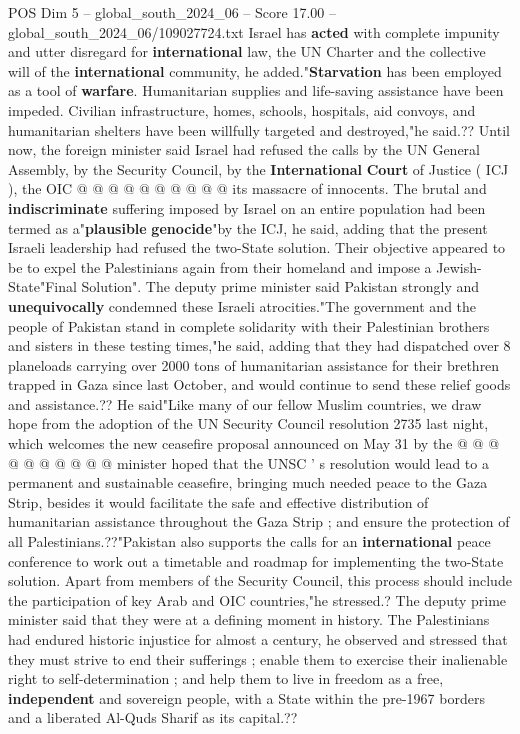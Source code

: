 \begin{textsample}{POS Dim 5 – global\_south\_2024\_06 – Score 17.00 – global\_south\_2024\_06/109027724.txt}
Israel has \textbf{acted} with complete impunity and utter disregard for \textbf{international} law, the UN Charter and the collective will of the \textbf{international} community, he added."\textbf{Starvation} has been employed as a tool of \textbf{warfare}.
Humanitarian supplies and life-saving assistance have been impeded.
Civilian infrastructure, homes, schools, hospitals, aid convoys, and humanitarian shelters have been willfully targeted and destroyed,"he said.??
Until now, the foreign minister said Israel had refused the calls by the UN General Assembly, by the Security Council, by the \textbf{International} \textbf{Court} of Justice ( ICJ ), the OIC @ @ @ @ @ @ @ @ @ @ its massacre of innocents.
The brutal and \textbf{indiscriminate} suffering imposed by Israel on an entire population had been termed as a"\textbf{plausible} \textbf{genocide}"by the ICJ, he said, adding that the present Israeli leadership had refused the two-State solution.
Their objective appeared to be to expel the Palestinians again from their homeland and impose a Jewish-State"Final Solution".
The deputy prime minister said Pakistan strongly and \textbf{unequivocally} condemned these Israeli atrocities."The government and the people of Pakistan stand in complete solidarity with their Palestinian brothers and sisters in these testing times,"he said, adding that they had dispatched over 8 planeloads carrying over 2000 tons of humanitarian assistance for their brethren trapped in Gaza since last October, and would continue to send these relief goods and assistance.??
He said"Like many of our fellow Muslim countries, we draw hope from the adoption of the UN Security Council resolution 2735 last night, which welcomes the new ceasefire proposal announced on May 31 by the @ @ @ @ @ @ @ @ @ @ minister hoped that the UNSC ' s resolution would lead to a permanent and sustainable ceasefire, bringing much needed peace to the Gaza Strip, besides it would facilitate the safe and effective distribution of humanitarian assistance throughout the Gaza Strip ; and ensure the protection of all Palestinians.??"Pakistan also supports the calls for an \textbf{international} peace conference to work out a timetable and roadmap for implementing the two-State solution.
Apart from members of the Security Council, this process should include the participation of key Arab and OIC countries,"he stressed.?
The deputy prime minister said that they were at a defining moment in history.
The Palestinians had endured historic injustice for almost a century, he observed and stressed that they must strive to end their sufferings ; enable them to exercise their inalienable right to self-determination ; and help them to live in freedom as a free, \textbf{independent} and sovereign people, with a State within the pre-1967 borders and a liberated Al-Quds Sharif as its capital.??

\end{textsample}
